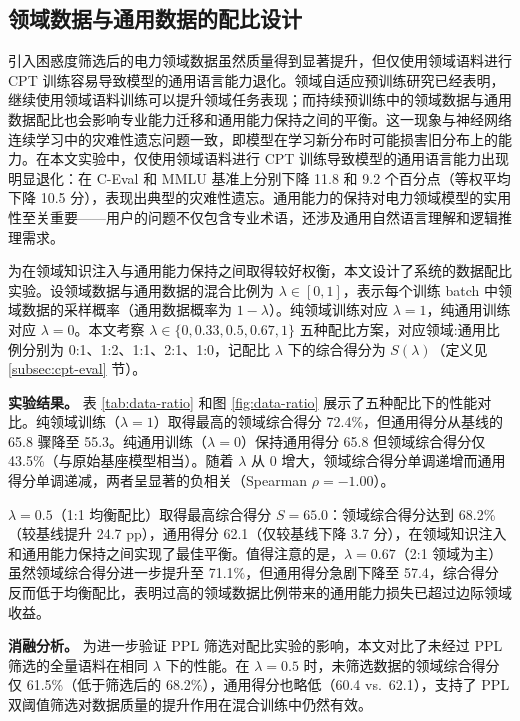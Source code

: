 \documentclass[fontset=fandol,type=master,campus=shenzhen,etitleauto=true]{hithesisbook}
\begin{document}
\subsection{领域数据与通用数据的配比设计}\label{ux9886ux57dfux6570ux636eux4e0eux901aux7528ux6570ux636eux7684ux914dux6bd4ux8bbeux8ba1}

引入困惑度筛选后的电力领域数据虽然质量得到显著提升，但仅使用领域语料进行 CPT 训练容易导致模型的通用语言能力退化。领域自适应预训练研究已经表明，继续使用领域语料训练可以提升领域任务表现\cite{ref6}；而持续预训练中的领域数据与通用数据配比也会影响专业能力迁移和通用能力保持之间的平衡\cite{ref52}。这一现象与神经网络连续学习中的灾难性遗忘问题一致，即模型在学习新分布时可能损害旧分布上的能力\cite{ref64}。在本文实验中，仅使用领域语料进行 CPT 训练导致模型的通用语言能力出现明显退化：在 C-Eval 和 MMLU 基准上分别下降 11.8 和 9.2 个百分点（等权平均下降 10.5 分），表现出典型的灾难性遗忘。通用能力的保持对电力领域模型的实用性至关重要------用户的问题不仅包含专业术语，还涉及通用自然语言理解和逻辑推理需求。

为在领域知识注入与通用能力保持之间取得较好权衡，本文设计了系统的数据配比实验。设领域数据与通用数据的混合比例为 $\lambda \in [0, 1]$，表示每个训练 batch 中领域数据的采样概率（通用数据概率为 $1-\lambda$）。纯领域训练对应 $\lambda = 1$，纯通用训练对应 $\lambda = 0$。本文考察 $\lambda \in \{0, 0.33, 0.5, 0.67, 1\}$ 五种配比方案，对应领域:通用比例分别为 0:1、1:2、1:1、2:1、1:0，记配比 $\lambda$ 下的综合得分为 $S(\lambda)$（定义见 \ref{subsec:cpt-eval} 节）。

\textbf{实验结果。} 表 \ref{tab:data-ratio} 和图 \ref{fig:data-ratio} 展示了五种配比下的性能对比。纯领域训练（$\lambda = 1$）取得最高的领域综合得分 72.4\%，但通用得分从基线的 65.8 骤降至 55.3。纯通用训练（$\lambda = 0$）保持通用得分 65.8 但领域综合得分仅 43.5\%（与原始基座模型相当）。随着 $\lambda$ 从 0 增大，领域综合得分单调递增而通用得分单调递减，两者呈显著的负相关（Spearman $\rho = -1.00$）。

$\lambda = 0.5$（1:1 均衡配比）取得最高综合得分 $S = 65.0$：领域综合得分达到 68.2\%（较基线提升 24.7 pp），通用得分 62.1（仅较基线下降 3.7 分），在领域知识注入和通用能力保持之间实现了最佳平衡。值得注意的是，$\lambda = 0.67$（2:1 领域为主）虽然领域综合得分进一步提升至 71.1\%，但通用得分急剧下降至 57.4，综合得分反而低于均衡配比，表明过高的领域数据比例带来的通用能力损失已超过边际领域收益。

\textbf{消融分析。} 为进一步验证 PPL 筛选对配比实验的影响，本文对比了未经过 PPL 筛选的全量语料在相同 $\lambda$ 下的性能。在 $\lambda = 0.5$ 时，未筛选数据的领域综合得分仅 61.5\%（低于筛选后的 68.2\%），通用得分也略低（60.4 vs.\ 62.1），支持了 PPL 双阈值筛选对数据质量的提升作用在混合训练中仍然有效。
\end{document}
